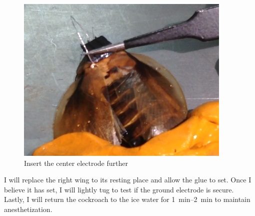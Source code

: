 {\begin{figure}[ht!]
\centering
\includegraphics[scale=0.4]{Surgery Photos/celectrode2.jpg}
\caption{Insert the center electrode further}
\label{fig:celectrode2}
\end{figure}}
I will replace the right wing to its resting place and allow the glue to set. Once I believe it has set, I will lightly tug to test if the ground electrode is secure. Lastly, I will return the cockroach to the ice water for \SIrange{1}{2}{\minute} to maintain anesthetization.

